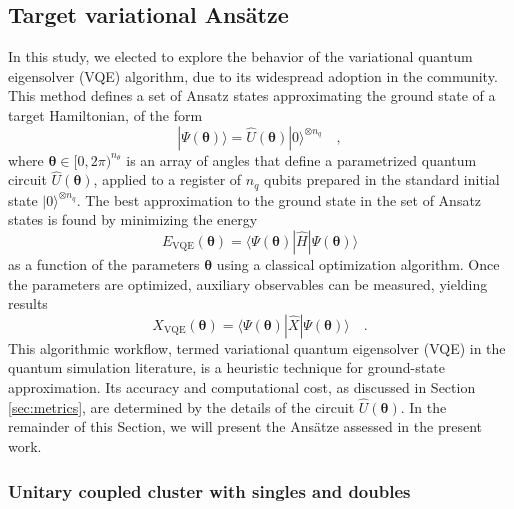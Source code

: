 \documentclass[aps,pra,onecolumn]{revtex4-2}
\newcommand{\bgreek}[1]{{\boldsymbol{#1}}}
\begin{document}
\subsection{Target variational Ans\"{a}tze}

In this study, we elected to explore the behavior of the variational quantum eigensolver (VQE) algorithm, due to its widespread adoption in the community.
This method defines a set of Ansatz states approximating the ground state of a target Hamiltonian, of the form 
\begin{equation}
| \Psi( \bgreek{\theta} ) \rangle = \hat{U}( \bgreek{\theta} ) | 0 \rangle^{\otimes n_q}
\quad,
\end{equation}
where $\bgreek{\theta} \in [0,2\pi)^{n_\theta}$ is an array of angles that define a parametrized quantum circuit $\hat{U}( \bgreek{\theta} )$, 
applied to a register of $n_q$ qubits prepared in the standard initial state $| 0 \rangle^{\otimes n_q}$.
The best approximation to the ground state in the set of Ansatz states is found by minimizing the energy 
\begin{equation}
E_{\mathrm{VQE}}( \bgreek{\theta} ) = \langle \Psi( \bgreek{\theta} ) | \hat{H} | \Psi( \bgreek{\theta} ) \rangle
\end{equation}
as a function of the parameters $\bgreek{\theta} $ using a classical optimization algorithm. 
Once the parameters are optimized, auxiliary observables can be measured, yielding results
\begin{equation}
X_{\mathrm{VQE}}( \bgreek{\theta} ) = \langle \Psi( \bgreek{\theta} ) | \hat{X} | \Psi( \bgreek{\theta} ) \rangle
\quad.
\end{equation}
This algorithmic workflow, termed variational quantum eigensolver (VQE) in the quantum simulation literature, 
is a heuristic technique for ground-state approximation. 
Its accuracy and computational cost, as discussed in Section \ref{sec:metrics}, are determined by the details of the circuit $\hat{U}( \bgreek{\theta} )$. 
In the remainder of this Section, we will present the Ans\"{a}tze assessed in the present work.

\subsubsection{Unitary coupled cluster with singles and doubles}
\end{document}
